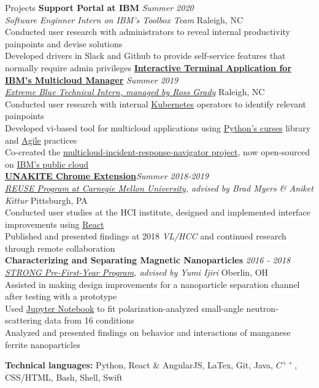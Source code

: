 \documentclass{resume}
\begin{document}
\begin{rSection}{Projects}
{\bf Support Portal at IBM} \hfill  {\em Summer 2020} \\
{\it Software Enginner Intern on IBM's Toolbox Team} \hfill { Raleigh, NC} \\
{Conducted user research with administrators to reveal internal productivity painpoints and devise solutions} \\
{Developed drivers in Slack and Github to provide self-service features that normally require admin privileges}
\href{https://github.com/IBM/multicloud-incident-response-navigator}{\bf Interactive Terminal Application for IBM's Multicloud Manager} \hfill  {\em Summer 2019} \\
\href{https://www.ibm.com/employment/extremeblue/index.html}{\em Extreme Blue Technical Intern, managed by Ross Grady} \hfill { Raleigh, NC} \\
{Conducted user research with internal \underline{Kubernetes} operators to identify relevant painpoints} \\
Developed vi-based tool for multicloud applications using \underline{Python's curses} library and \underline{Agile} practices \\
{Co-created the \href{https://github.com/IBM/multicloud-incident-response-navigator}{multicloud-incident-response-navigator project}, now open-sourced on \href{https://github.com/IBM/multicloud-incident-response-navigator}{IBM's public cloud}} \\
{\bf \href{https://unakite.info/}{UNAKITE Chrome Extension}}\hfill {\em Summer 2018-2019} \\
{\em \href{https://www.cmu.edu/scs/isr/reuse/}{REUSE Program at Carnegie Mellon University}, advised by Brad Myers \& Aniket Kittur} \hfill { Pittsburgh, PA}\\
Conducted user studies at the HCI institute, designed and implemented interface improvements using \underline{React} \\
Published and presented findings at 2018 {\em VL/HCC} and continued research through remote collaboration\\
{\bf Characterizing and Separating Magnetic Nanoparticles } \hfill {\em 2016 - 2018}\\
{\em \href{https://www.oberlin.edu/undergraduate-research/programs/strong}{STRONG Pre-First-Year Program}, advised by Yumi Ijiri } \hfill { Oberlin, OH}\\
Assisted in making design improvements for a nanoparticle separation channel after testing with a prototype \\
Used \underline{Jupyter Notebook} to fit polarization-analyzed small-angle neutron-scattering data from 16 conditions \\
Analyzed and presented findings on behavior and interactions of manganese ferrite nanoparticles

 \textbf{Technical languages:} {Python, React \& AngularJS, LaTex, Git, Java, {$C^{++}$}, CSS/HTML, Bash, Shell, Swift}
\end{rSection}
\end{document}
